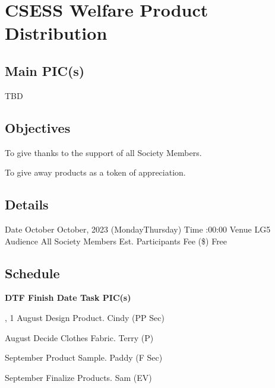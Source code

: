\section{CSESS Welfare Product Distribution}

\subsection{Main PIC(s)}
TBD

\subsection{Objectives}
\startitemize
\item To give thanks to the support of all Society Members.
\item To give away products as a token of appreciation.
\stopitemize

\subsection{Details}
\starttabulate[|rB|l|]
\NC Date
 October  October, 2023 (Monday\endash Thursday) \NR
\NC Time
:00:00 \NR
\NC Venue
\NC LG5 \NR
\NC Audience
\NC All Society Members \NR
\NC Est. Participants
 \NR
\NC Fee (\$)
\NC Free \NR
\stoptabulate

\subsection{Schedule}

\setupTABLE[c][1][width=0.75in]
\setupTABLE[c][2][width=1in]
\setupTABLE[c][3][width=3in]
\setupTABLE[c][4][width=1.25in]
\bTABLE
\bTABLEhead

\bTR\bTH    \bf{DTF}
\eTH\bTH    \bf{Finish Date}
\eTH\bTH    \bf{Task}
\eTH\bTH    \bf{PIC(s)}
\eTH\eTR

\eTABLEhead
\bTABLEbody

\bTR{}, 1
\eTD{} August
\eTD\bTD Design Product.
\eTD\bTD Cindy (PP Sec)
\eTD\eTR

\bTR{}
\eTD{} August
\eTD\bTD Decide Clothes Fabric.
\eTD\bTD Terry (P)
\eTD\eTR

\bTR{}
\eTD{} September
\eTD\bTD Product Sample.
\eTD\bTD Paddy (F Sec)
\eTD\eTR

\bTR{}
\eTD{} September
\eTD\bTD Finalize Products.
\eTD\bTD Sam (EV)
\eTD\eTR

